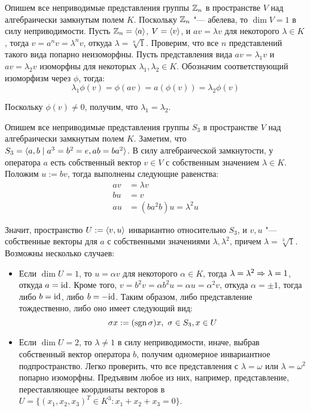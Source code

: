 \begin{example}
	Опишем все неприводимые представления группы $\mathbb{Z}_n$ в пространстве $V$ над алгебраически замкнутым полем $K$. Поскольку $\mathbb{Z}_n$ "--- абелева, то $\dim{V} = 1$ в силу неприводимости. Пусть $\mathbb{Z}_n = \langle a\rangle$, $V = \langle v \rangle$, и $av = \lambda v$ для некоторого $\lambda \in K$, тогда $v = a^nv = \lambda^n v$, откуда $\lambda = \sqrt[n]{1}$. Проверим, что все $n$ представлений такого вида попарно неизоморфны. Пусть представления вида $av = \lambda_1 v$ и $av = \lambda_2 v$ изоморфны для некоторых $\lambda_1, \lambda_2 \in K$. Обозначим соответствующий изоморфизм через $\phi$, тогда:
	\[\lambda_1\phi(v) = \phi(av) = a(\phi(v)) = \lambda_2\phi(v)\]
	
	Поскольку $\phi(v) \ne 0$, получим, что $\lambda_1 = \lambda_2$.
\end{example}

\begin{example}
	Опишем все неприводимые представления группы $S_3$ в пространстве $V$ над алгебраически замкнутым полем $K$. Заметим, что $S_3 = \langle a, b \mid a^3 = b^2 = e, ab = ba^2\rangle$. В силу алгебраической замкнутости, у оператора $a$ есть собственный вектор $v \in V$ с собственным значением $\lambda \in K$. Положим $u := bv$, тогда выполнены следующие равенства:
	\begin{align*}
		av &= \lambda v
		\\
		bu &= v
		\\
		au &= (ba^2b)u = \lambda^2u
	\end{align*}
	
	 Значит, пространство $U := \langle v, u\rangle$ инвариантно относительно $S_3$, и $v, u$ "--- собственные векторы для $a$ с собственными значениями $\lambda, \lambda^2$, причем $\lambda = \sqrt[3]{1}$. Возможны несколько случаев:
	 \begin{itemize}
	 	\item Если $\dim{U} = 1$, то $u = \alpha v$ для некоторого $\alpha \in K$, тогда $\lambda = \lambda^2 \Rightarrow \lambda = 1$, откуда $a = \mathrm{id}$. Кроме того, $v = b^2v = \alpha b^2u = \alpha u = \alpha^2 v$, откуда $\alpha = \pm 1$, тогда либо $b = \mathrm{id}$, либо $b = -\mathrm{id}$. Таким образом, либо представление тождественно, либо оно имеет следующий вид:
	 	\[\sigma x := (\operatorname{sgn}\sigma)x,~\sigma \in S_3, x \in U\]
	 	
	 	\item Если $\dim{U} = 2$, то $\lambda \ne 1$ в силу неприводимости, иначе, выбрав собственный вектор оператора $b$, получим одномерное инвариантное подпространство. Легко проверить, что все представления с $\lambda = \omega$ или $\lambda = \omega^2$ попарно изоморфны. Предъявим любое из них, например, представление, переставляющее координаты векторов в $U = \{(x_1, x_2, x_3)^T \in K^3: x_1 + x_2 + x_3 = 0\}$.
	 \end{itemize}
\end{example}

